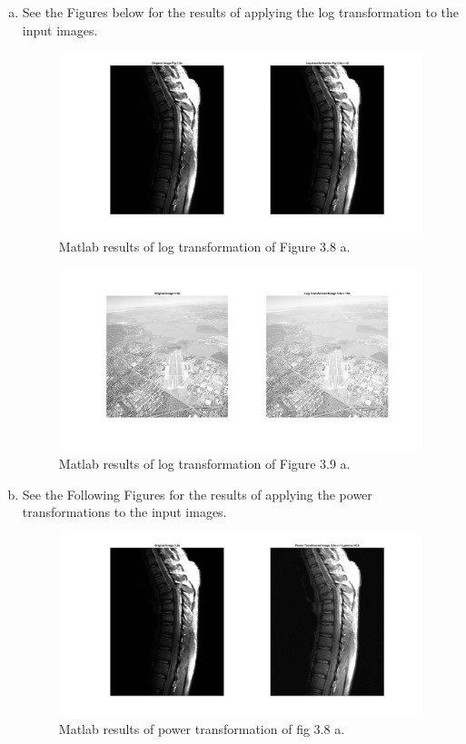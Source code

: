 \documentclass[./rarnold_report2.tex]{subfiles}
\begin{document}
\begin{enumerate}[a.]
  \item See the Figures below for the results of applying the log transformation to the input images. 
  
  	\begin{figure}[!htbp]
	\centering
	\includegraphics[scale=0.25]{"log_spine"}
	\caption{Matlab results of log transformation of Figure 3.8 a.} 
	\label{log_spine}
	\end{figure}
	
	\begin{figure}[!htbp]
	\centering
	\includegraphics[scale=0.25]{"log_city"}
	\caption{Matlab results of log transformation of Figure 3.9 a.} 
	\label{log_city}
	\end{figure}
  
  \item See the Following Figures for the results of applying the power transformations to the input images.
  
  	\begin{figure}[!htbp]
	\centering
	\includegraphics[scale=0.25]{"power_spine"}
	\caption{Matlab results of power transformation of fig 3.8 a.} 
	\label{power_spine}
	\end{figure}
	

\end{enumerate}
\end{document}
